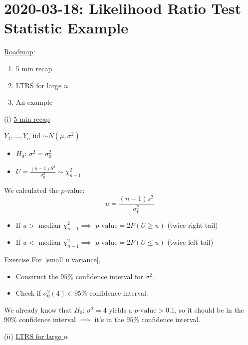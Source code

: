 \section{2020-03-18: Likelihood Ratio Test Statistic Example}
\underline{Roadmap}:
\begin{enumerate}[label=(\roman*)]
    \item 5 min recap
    \item LTRS for large $ n $
    \item An example
\end{enumerate}

(i) \underline{5 min recap}

$ Y_1,\ldots ,Y_n $ iid $ \sim N(\mu,\sigma^2) $
\begin{itemize}
    \item $ H_0 $: $ \sigma^2=\sigma_0^2 $
    \item $ U=\frac{(n-1)S^2}{\sigma_0^2} \sim \chi^2_{n-1} $
\end{itemize}
We calculated the $ p $-value:
\[ u=\frac{(n-1)s^2}{\sigma_0^2}  \]
\begin{itemize}
    \item If $ u > $ median $ \chi^2_{n-1} \implies $ $ p\text{-value}=2P(U\geqslant u) $ (twice right tail)
    \item If $ u < $ median $ \chi^2_{n-1} \implies $ $ p\text{-value}=2P(U\leqslant u) $ (twice left tail)
\end{itemize}
\underline{Exercise} For~\ref{small u variance},
\begin{itemize}
    \item Construct the $ 95\% $ confidence interval for $ \sigma^2 $.
    \item Check if $ \sigma_0^2(4)\in 95\% $ confidence interval.
\end{itemize}
We already know that $ H_0 $: $ \sigma^2=4 $ yields a $ p\text{-value}>0.1 $, so it should
be in the $ 90\% $ confidence interval $ \implies $ it's in the $ 95\% $ confidence interval.

(ii) \underline{LTRS for large $ n $}

